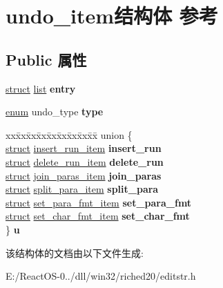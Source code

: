 \hypertarget{structundo__item}{}\section{undo\+\_\+item结构体 参考}
\label{structundo__item}
\subsection*{Public 属性}
\begin{DoxyCompactItemize}
\item 
\mbox{\label{structundo__item_a360db15fac5fb2c0eb2b9549ef697783}} 
\hyperlink{interfacestruct}{struct} \hyperlink{classlist}{list} {\bfseries entry}
\item 
\mbox{\label{structundo__item_a7ab88b02d60102569699769b3c6f374f}} 
\hyperlink{interfaceenum}{enum} undo\+\_\+type {\bfseries type}
\item 
\mbox{\label{structundo__item_a12a6e0643ec4ab2ddfd954466b226d5f}} 
\begin{tabbing}
xx\=xx\=xx\=xx\=xx\=xx\=xx\=xx\=xx\=\kill
union \{\\
\>\hyperlink{interfacestruct}{struct} \hyperlink{structinsert__run__item}{insert\_run\_item} {\bfseries insert\_run}\\
\>\hyperlink{interfacestruct}{struct} \hyperlink{structdelete__run__item}{delete\_run\_item} {\bfseries delete\_run}\\
\>\hyperlink{interfacestruct}{struct} \hyperlink{structjoin__paras__item}{join\_paras\_item} {\bfseries join\_paras}\\
\>\hyperlink{interfacestruct}{struct} \hyperlink{structsplit__para__item}{split\_para\_item} {\bfseries split\_para}\\
\>\hyperlink{interfacestruct}{struct} \hyperlink{structset__para__fmt__item}{set\_para\_fmt\_item} {\bfseries set\_para\_fmt}\\
\>\hyperlink{interfacestruct}{struct} \hyperlink{structset__char__fmt__item}{set\_char\_fmt\_item} {\bfseries set\_char\_fmt}\\
\} {\bfseries u}\\

\end{tabbing}\end{DoxyCompactItemize}


该结构体的文档由以下文件生成\+:\begin{DoxyCompactItemize}
\item 
E\+:/\+React\+O\+S-\/0../dll/win32/riched20/editstr.\+h\end{DoxyCompactItemize}
